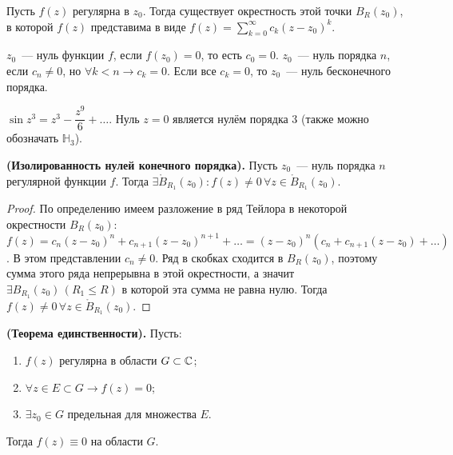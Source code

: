 
Пусть \(f(z)\) регулярна в \(z_0\). Тогда существует окрестность этой точки \(B_R(z_0)\), в которой
\(f(z)\) представима в виде \(f(z) = \sum\limits_{k = 0}^\infty c_k (z-z_0)^k\).

\begin{definition}
    \(z_0\)~--- нуль функции \(f\), если \(f(z_0) = 0\), то есть \(c_0 = 0\). \(z_0\)~--- нуль 
    порядка \(n\), если \(c_n \ne 0\), но \(\forall k < n \rightarrow c_k = 0\). Если все 
    \(c_k = 0\), то \(z_0\)~--- нуль бесконечного порядка.
\end{definition}

\begin{example}
    \(\sin{z^3} = z^3 - \dfrac{z^9}{6} + \dots\). Нуль \(z = 0\) является нулём порядка 3 (также 
    можно обозначать \(\mathbb{H}_3\)).
\end{example}

\begin{statement}\label{20:isolated_zeros}
    \textbf{(Изолированность нулей конечного порядка).} Пусть \(z_0\)~--- нуль порядка \(n\)
    регулярной функции \(f\). Тогда \(\exists \mathring{B}_{R_1}(z_0)\colon f(z) \ne 0 \, \forall z 
    \in \mathring{B}_{R_1}(z_0)\).
\end{statement}

\begin{proof}
    По определению имеем разложение в ряд Тейлора в некоторой окрестности \(B_R(z_0)\): \(f(z) = 
    c_n(z-z_0)^n + c_{n+1}(z-z_0)^{n+1} + \dots = (z-z_0)^n(c_n + c_{n+1} (z-z_0) + \dots)\). В этом
    представлении \(c_n \ne 0\). Ряд в скобках сходится в \(B_R(z_0)\), поэтому сумма этого ряда 
    непрерывна в этой окрестности, а значит \(\exists B_{R_1}(z_0) \, (R_1 \le R)\) в которой эта
    сумма не равна нулю. Тогда \(f(z) \ne 0 \, \forall z \in \mathring{B}_{R_1}(z_0)\).
\end{proof}

\begin{statement}
    \textbf{(Теорема единственности).} Пусть:
    \begin{enumerate}[wide=20pt, label=\arabic*., itemsep=0ex]
        \item \(f(z)\) регулярна в области \(G \subset \mathbb{C}\);
        \item \(\forall z \in E \subset G \rightarrow f(z) = 0\);
        \item \(\exists z_0 \in G\) предельная для множества \(E\).
    \end{enumerate}
    Тогда \(f(z) \equiv 0\) на области \(G\).
\end{statement}

